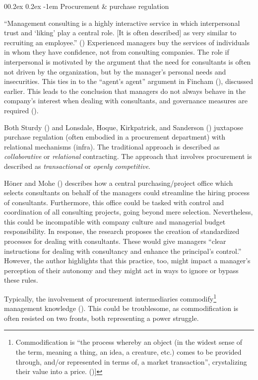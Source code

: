 \documentclass[
  man,floatsintext]{apa6}
\makeatletter
\let\oldparagraph\paragraph
\renewcommand{\paragraph}[1]{\oldparagraph{#1}\mbox{}}
\renewcommand{\paragraph}{\@startsection{paragraph}{4}{\parindent}%
  {0\baselineskip \@plus 0.2ex \@minus 0.2ex}%
  {-1em}%
  {\normalfont\normalsize\bfseries\itshape\typesectitle}}
\makeatother
\begin{document}
\paragraph{Procurement \& purchase regulation}\label{procurement-purchase-regulation}

``Management consulting is a highly interactive service in which interpersonal trust and `liking' play a central role. {[}It is often described{]} as very similar to recruiting an employee.'' () Experienced managers buy the services of individuals in whom they have confidence, not from consulting companies. The role if interpersonal is motivated by the argument that the need for consultants is often not driven by the organization, but by the manager's personal needs and insecurities. This ties in to the ``agent's agent'' argument in Fincham (), discussed earlier. This leads to the conclusion that managers do not always behave in the company's interest when dealing with consultants, and governance measures are required ().

Both Sturdy () and Lonsdale, Hoque, Kirkpatrick, and Sanderson () juxtapose purchase regulation (often embodied in a procurement department) with relational mechanisms (infra). The traditional approach is described as \emph{collaborative} or \emph{relational} contracting. The approach that involves procurement is described as \emph{transactional} or \emph{openly competitive}.

Höner and Mohe () describes how a central purchasing/project office which selects consultants on behalf of the managers could streamline the hiring process of consultants. Furthermore, this office could be tasked with control and coordination of all consulting projects, going beyond mere selection. Nevertheless, this could be incompatible with company culture and managerial budget responsibility. In response, the research proposes the creation of standardized processes for dealing with consultants. These would give managers ``clear instructions for dealing with consultancy and enhance the principal's control.'' However, the author highlights that this practice, too, might impact a manager's perception of their autonomy and they might act in ways to ignore or bypass these rules.

Typically, the involvement of procurement intermediaries commodify\footnote{Commodification is ``the process whereby an object (in the widest sense of the term, meaning a thing, an idea, a creature, etc.) comes to be provided through, and/or represented in terms of, a market transaction'', crystalizing their value into a price. (){]}} management knowledge (). This could be troublesome, as commodification is often resisted on two fronts, both representing a power struggle.
\end{document}
